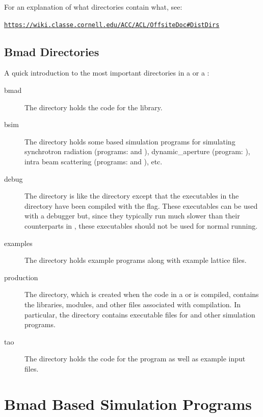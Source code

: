 \documentclass{hitec}
\newcommand{\Section}[1]{\section{#1}\vspace*{-1ex}}
\newenvironment{display}
  {\vspace*{-1.5ex} \begin{alltt}}
  {\end{alltt} \vspace*{-1.0ex}}
\begin{document}
For an explanation of what directories contain what, see:
\begin{display}
  \url{https://wiki.classe.cornell.edu/ACC/ACL/OffsiteDoc#DistDirs}
\end{display}

\newpage

\subsection{Bmad Directories}
\label{s:bmad.dir}

A quick introduction to the most important directories in a  or a :
  \begin{description}
  \item[bmad] \Newline
The  directory holds the code for the \bmad library.
  \item[bsim] \Newline
The  directory holds some \bmad based simulation programs for simulating
synchrotron radiation (programs:  and ), dynamic_aperture
(program: ), intra beam scattering (programs:  and
), etc.
  \item[debug] \Newline
The  directory is like the  directory except that the executables
in the  directory have been compiled with the  flag. These executables
can be used with a debugger but, since they typically run much slower than their counterparts in
, these executables should not be used for normal running.
  \item[examples] \Newline
The  directory holds example programs along with example lattice files.
  \item[production] \Newline
The  directory, which is created when the code in a  or
 is compiled, contains the libraries, modules, and other files associated with
compilation. In particular, the  directory contains executable files
for \tao and other simulation programs.

  \item[tao] \Newline
The  directory holds the code for the \tao program as well as example input
files.
  \end{description}

\newpage

\Section{Bmad Based Simulation Programs}
\label{s:programs}
\end{document}
